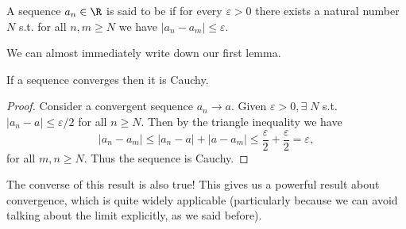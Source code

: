 \begin{definition}
	A sequence $a_n \in \R$ is said to be  if for every $\varepsilon > 0$ there exists a natural number $N$ s.t. for all $n, m \geq N$ we have $|a_n - a_m| \leq \varepsilon$.
\end{definition}

We can almost immediately write down our first lemma.

\begin{lemma}
	If a sequence converges then it is Cauchy.
\end{lemma}
\begin{proof}
	Consider a convergent sequence $a_n \rightarrow a$.
	Given $\varepsilon > 0, \exists \; N$ s.t.
	$|a_n - a| \leq \varepsilon / 2$ for all $n \geq N$.
	Then by the triangle inequality we have
	$$
	|a_n - a_m| \leq |a_n - a| + |a - a_m| \leq \frac{\varepsilon}{2} + \frac{\varepsilon}{2} = \varepsilon,
	$$
	for all $m, n \geq N$. Thus the sequence is Cauchy.
\end{proof}

The converse of this result is also true! This gives us a powerful result about convergence, which is quite widely applicable (particularly because we can avoid talking about the limit explicitly, as we said before).

